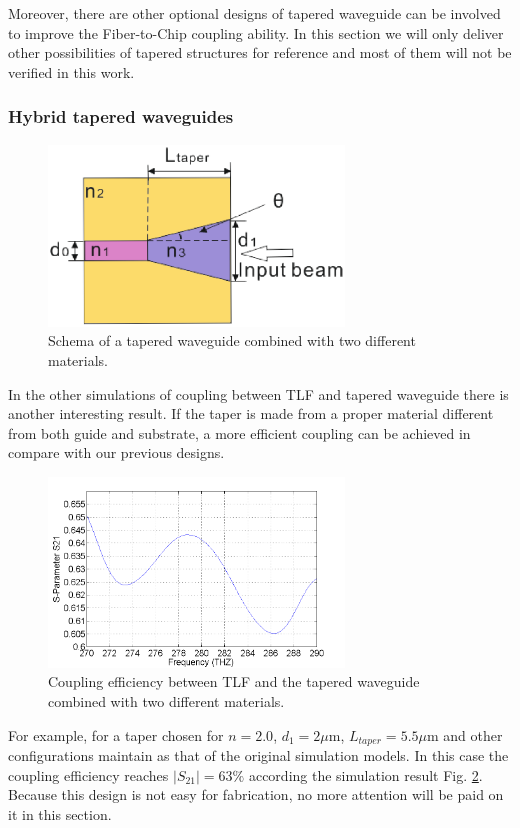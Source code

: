 Moreover, there are other optional designs of tapered waveguide can be involved to improve the Fiber-to-Chip coupling ability. In this section we will only deliver other possibilities of tapered structures for reference and most of them will not be verified in this work.   \\
\subsubsection*{Hybrid tapered waveguides}%
\begin{figure}[!ht]
\centering
\includegraphics[width=0.7\textwidth]{bilder/tapered_waveguide_others}
\caption{Schema of a tapered waveguide combined with two different materials.}
\label{fig:tapered_waveguide_others}
\end{figure} 
In the other simulations of coupling between TLF and tapered waveguide there is another interesting result. If the taper is made from a proper material different from both guide and substrate, a more efficient coupling can be achieved in compare with our previous designs.\\

\begin{figure}[!ht]
\centering
\includegraphics[width=0.7\textwidth]{bilder/s21_tapered_waveguide_others}
\caption{Coupling efficiency between TLF and the tapered waveguide combined with two different materials.}
\label{fig:tapered_waveguide_others_coupling}
\end{figure} 
For example, for a taper chosen for $n=2.0$, $d_{1}=2\mu$m, $L_{taper}=5.5\mu$m and other configurations maintain as that of the original simulation models. In this case the coupling efficiency reaches $|S_{21}|=63\%$ according the simulation result Fig. \ref{fig:tapered_waveguide_others_coupling}.  Because this design is not easy for fabrication, no more attention will be paid on it in this section.\\
   

